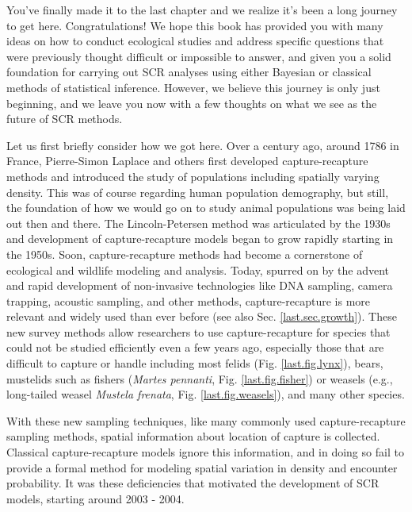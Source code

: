 You've finally made it to the last chapter and we realize it's been a
long journey to get here. Congratulations! %
We hope this book has provided you with many ideas on how to conduct
ecological studies and address specific questions that were previously
thought difficult or impossible to answer, and given you a solid
foundation for carrying out SCR analyses
using either Bayesian or classical methods of statistical inference.
However, we believe this journey is only just beginning, and we leave
you now with a few thoughts on what we see as the future of SCR
methods.

Let us first briefly consider how we got here. Over a century ago, around 1786 in France, Pierre-Simon Laplace and others first developed
capture-recapture methods and introduced the study of
populations including spatially varying density. This was of
course regarding human population demography, but still, the
foundation of how we would go on to study animal populations was being
laid out then and there.  The Lincoln-Petersen method was articulated
by
the 1930s and development of capture-recapture models began to grow
rapidly %
starting in the 1950s.  Soon, capture-recapture methods had become a
cornerstone of ecological and wildlife modeling and analysis. Today,
spurred on by the advent and rapid development of non-invasive technologies like DNA
sampling, camera trapping, acoustic sampling, and other methods,
capture-recapture is more relevant and widely used than ever before
(see also Sec. \ref{last.sec.growth}). These new survey methods allow
researchers to use capture-recapture for species that could not be
studied efficiently even a few years ago, especially those that are
difficult to capture or handle including most felids
(Fig. \ref{last.fig.lynx}), bears,
mustelids such as
fishers ({\it Martes pennanti}, Fig. \ref{last.fig.fisher}) or 
 weasels (e.g., long-tailed weasel {\it Mustela frenata}, Fig. \ref{last.fig.weasels}), 
and many other species.

With these new sampling techniques, like many commonly used
capture-recapture sampling methods,
spatial information about location of capture is
collected. %
Classical capture-recapture models ignore this information, and in
doing so fail to provide a formal method for modeling spatial
variation in density and encounter
probability. %
It was these deficiencies that motivated %
the development of SCR models, starting around
2003 - 2004.

